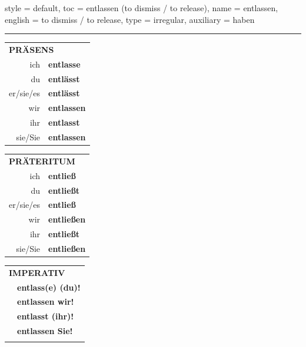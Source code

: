 \begin{verbentry}{
  style = {default},
  toc = {entlassen (to dismiss / to release)},
  name = {entlassen},
  english = {to dismiss / to release},
  type = {irregular},
  auxiliary = {haben}
}
 
    
     \vspace{5pt}

    \hrule
    
    \vspace{5pt}

  \begin{tabular}{rl}
     \multicolumn{2}{l}{\textbf{PRÄSENS} }\\
    ich & \textbf{entlasse}\\
    du & \textbf{entlässt}\\
    er/sie/es & \textbf{entlässt}\\
    wir & \textbf{entlassen}\\
    ihr & \textbf{entlasst}\\
    sie/Sie & \textbf{entlassen}\\
  \end{tabular}
  \hfill
     \begin{tabular}{rl}
    \multicolumn{2}{l}{\textbf{PRÄTERITUM} }\\
    ich & \textbf{entließ}\\
    du & \textbf{entließt}\\
    er/sie/es & \textbf{entließ}\\
    wir & \textbf{entließen}\\
    ihr & \textbf{entließt}\\
    sie/Sie & \textbf{entließen}\\
  \end{tabular}
  \hfill
  \begin{tabular}{rl}
     \multicolumn{2}{l}{\textbf{IMPERATIV} }\\
   & \textbf{entlass(e) (du)!}\\
   & \textbf{entlassen wir!}\\
   & \textbf{entlasst (ihr)!}\\
   & \textbf{entlassen Sie!}\\
   & \vspace{10pt}
  \end{tabular}

    \vspace{10pt}


\end{verbentry}
